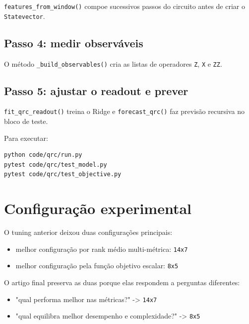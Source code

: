 \documentclass[12pt]{article}
\providecommand{\tightlist}{%
              \setlength{\itemsep}{0pt}\setlength{\parskip}{0pt}}
\begin{document}
\texttt{features\_from\_window()} compoe sucessivos passos do circuito antes de criar o \texttt{Statevector}.

\subsection{Passo 4: medir observáveis}\label{44-passo-4-medir-observuxe1veis}

O método \texttt{\_build\_observables()} cria as listas de operadores \texttt{Z}, \texttt{X} e \texttt{ZZ}.

\subsection{Passo 5: ajustar o readout e prever}\label{45-passo-5-ajustar-o-readout-e-prever}

\texttt{fit\_qrc\_readout()} treina o Ridge e \texttt{forecast\_qrc()} faz previsão recursiva no bloco de teste.

Para executar:

\begin{verbatim}
python code/qrc/run.py
pytest code/qrc/test_model.py
pytest code/qrc/test_objective.py
\end{verbatim}

\section{Configuração experimental}\label{5-configurauxe7uxe3o-experimental}

O tuning anterior deixou duas configurações principais:

\begin{itemize}
\tightlist
\item
  melhor configuração por rank médio multi-métrica: \texttt{14x7}
\item
  melhor configuração pela função objetivo escalar: \texttt{8x5}
\end{itemize}

O artigo final preserva as duas porque elas respondem a perguntas diferentes:

\begin{itemize}
\tightlist
\item
  "qual performa melhor nas métricas?" -\textgreater{} \texttt{14x7}
\item
  "qual equilibra melhor desempenho e complexidade?" -\textgreater{} \texttt{8x5}
\end{itemize}
\end{document}
